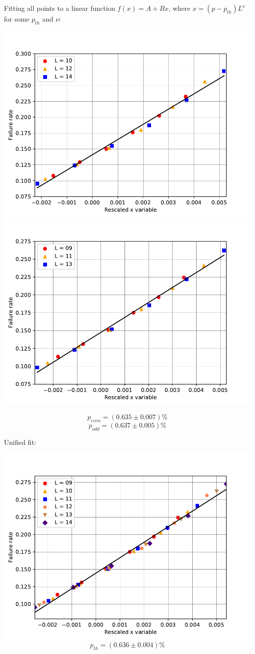 \documentclass[pra]{revtex4-1}
\begin{document}
\noindent Fitting all points to a linear function $f(x) = A + Bx$, where $x=(p-p_{th})L^{\nu}$ for some $p_{th}$ and $\nu$: 
  
\includegraphics[width=.49\textwidth]{../graphs-paper2/lcy-dephasing-even-rescaled.pdf}
\includegraphics[width=.49\textwidth]{../graphs-paper2/lcy-dephasing-odd-rescaled.pdf}

\[  p_{even} = (0.635 \pm 0.007)\% \]
\[  p_{odd} = (0.637 \pm 0.005)\% \]
\clearpage 

Unified fit: \begin{center} 

\includegraphics[width=.9\textwidth]{../graphs-paper2/lcy-dephasing-rescaled.pdf}
\[  p_{th} = (0.636 \pm 0.004)\% \] \end{center}
\clearpage 
\end{document}
